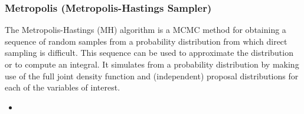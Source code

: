 \subsubsection{Metropolis (Metropolis-Hastings Sampler)}
\label{subsubsubsec:metropolis}
The Metropolis-Hastings (MH) algorithm is a MCMC method for obtaining a sequence of random samples from a probability
distribution from which direct sampling is difficult. This sequence can be used to approximate the distribution or
to compute an integral. It simulates from a probability distribution by making
use of the full joint density function and (independent) proposal distributions for each of
the variables of interest.

%
\attrIntro

\begin{itemize}
  \itemsep0em
  \item \nameDescription
\end{itemize}


